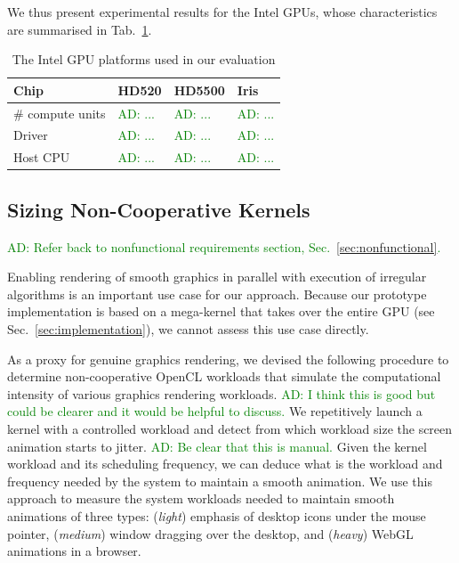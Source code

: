 \documentclass[numbers,nocopyrightspace,10pt]{sigplanconf}
\newcommand{\ADComment}[1]{\textcolor{green}{AD: #1}}
\newcommand{\mytab}{Tab.~}
\newcommand{\mysec}{Sec.~}
\begin{document}
We thus present experimental results for the Intel GPUs, whose characteristics are summarised in \mytab\ref{tab:chipstested}.

\begin{table}
\small
\centering
\begin{tabular}{ l l l l }
Chip & HD520 & HD5500 & Iris\\
\hline
\# compute units  & \ADComment{...} & \ADComment{...} & \ADComment{...} \\
Driver   & \ADComment{...} & \ADComment{...} & \ADComment{...} \\
Host CPU & \ADComment{...} & \ADComment{...} & \ADComment{...} \\
\end{tabular}
\caption{The Intel GPU platforms used in our evaluation}
\label{tab:chipstested}
\end{table}

\subsection{Sizing Non-Cooperative Kernels}\label{sec:sizingnoncoop}

\ADComment{Refer back to nonfunctional requirements section, \mysec\ref{sec:nonfunctional}.}

Enabling rendering of smooth graphics in parallel with execution of irregular algorithms is an important use case for our approach.  Because our prototype implementation is based on a mega-kernel that takes over the entire GPU (see \mysec\ref{sec:implementation}), we cannot assess this use case directly.

As a proxy for genuine graphics rendering, we devised the following
procedure to determine non-cooperative OpenCL workloads that simulate
the computational intensity of various graphics rendering workloads.
%
\ADComment{I think this is good but could be clearer and it would be helpful to discuss.}
We repetitively launch a kernel with a
controlled workload and detect from which workload size the screen
animation starts to jitter. \ADComment{Be clear that this is manual.} Given the kernel workload and its
scheduling frequency, we can deduce what is the workload and frequency
needed by the system to maintain a smooth animation. We use this
approach to measure the system workloads needed to maintain smooth
animations of three types: (\emph{light}) emphasis of desktop icons
under the mouse pointer, (\emph{medium}) window dragging over the
desktop, and (\emph{heavy}) WebGL animations in a browser.
\end{document}

